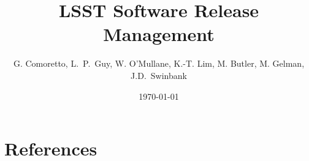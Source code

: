 \documentclass[DM,lsstdraft,toc]{lsstdoc}
\title{LSST Software Release Management}
\author{%
G. Comoretto, L.~P.~Guy, W. O'Mullane, K.-T. Lim, M. Butler, M. Gelman, J.D.~Swinbank
}
\date{\today}
\begin{document}
\maketitle



\newpage


\newpage


\newpage


\newpage
\appendix

\section{References} \label{sec:bib}


\newpage
\printglossaries
\end{document}

